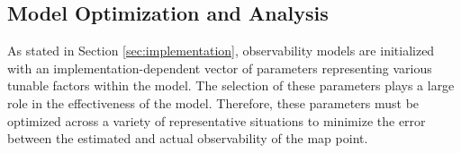 \subsection{Model Optimization and Analysis}

As stated in Section \ref{sec:implementation}, observability models are initialized with an implementation-dependent vector of parameters representing various tunable factors within the model. The selection of these parameters plays a large role in the effectiveness of the model. Therefore, these parameters must be optimized across a variety of representative situations to minimize the error between the estimated and actual observability of the map point. 

\subsubsection{}